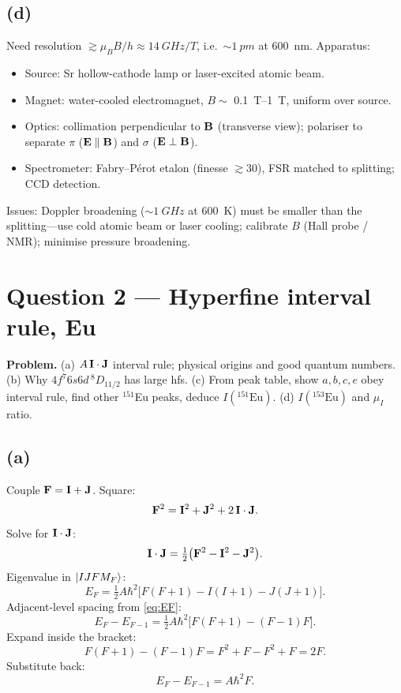 \documentclass[11pt]{article}
\begin{document}
\subsection*{(d)}

Need resolution $\gtrsim \mu_B B/h\approx \SI{14}{GHz/T}$, i.e.\ $\sim\SI{1}{pm}$ at \SI{600}{nm}. Apparatus:
\begin{itemize}
\item Source: Sr hollow-cathode lamp or laser-excited atomic beam.
\item Magnet: water-cooled electromagnet, $B\sim$ \SIrange{0.1}{1}{T}, uniform over source.
\item Optics: collimation perpendicular to $\vb B$ (transverse view); polariser to separate $\pi$ ($\vb E\parallel\vb B$) and $\sigma$ ($\vb E\perp\vb B$).
\item Spectrometer: Fabry--P\'erot etalon (finesse $\gtrsim 30$), FSR matched to splitting; CCD detection.
\end{itemize}
Issues: Doppler broadening ($\sim\SI{1}{GHz}$ at \SI{600}{K}) must be smaller than the splitting---use cold atomic beam or laser cooling; calibrate $B$ (Hall probe / NMR); minimise pressure broadening.

\section*{Question 2 --- Hyperfine interval rule, Eu}

\textbf{Problem.} (a) $A\,\vb I\cdot\vb J$ interval rule; physical origins and good quantum numbers. (b) Why $4f^7 6s6d\,{}^8D_{11/2}$ has large hfs. (c) From peak table, show $a,b,c,e$ obey interval rule, find other ${}^{151}$Eu peaks, deduce $I({}^{151}\text{Eu})$. (d) $I({}^{153}\text{Eu})$ and $\mu_I$ ratio.

\subsection*{(a)}

Couple $\vb F=\vb I+\vb J$. Square:
\[ \vb F^2=\vb I^2+\vb J^2+2\,\vb I\cdot\vb J. \]
Solve for $\vb I\cdot\vb J$:
\[ \vb I\cdot\vb J=\tfrac{1}{2}\big(\vb F^2-\vb I^2-\vb J^2\big). \]
Eigenvalue in $\ket{IJFM_F}$:
\begin{equation}
E_F=\tfrac{1}{2}A\hbar^2\big[F(F+1)-I(I+1)-J(J+1)\big].
\label{eq:EF}
\end{equation}
Adjacent-level spacing from \eqref{eq:EF}:
\[ E_F-E_{F-1}=\tfrac{1}{2}A\hbar^2\big[F(F+1)-(F-1)F\big]. \]
Expand inside the bracket:
\[ F(F+1)-(F-1)F=F^2+F-F^2+F=2F. \]
Substitute back:
\begin{equation}
E_F-E_{F-1}=A\hbar^2 F.
\label{eq:interval}
\end{equation}
\end{document}
